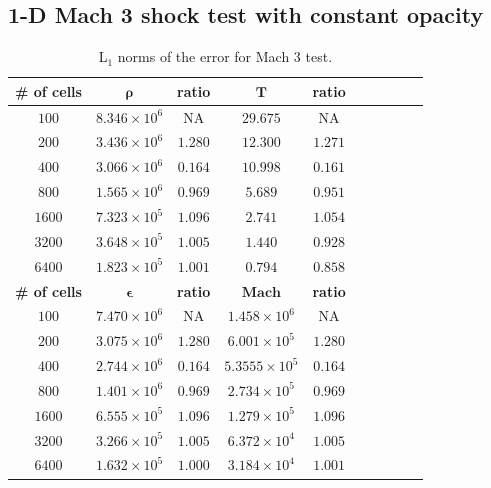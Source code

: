 \documentclass[times,doublespace]{fldauth}%
\begin{document}
\subsection{1-D Mach 3 shock test with constant opacity}
%
\begin{table}[H]
\caption{\label{tbl:table1} L$_1$ norms of the error for Mach 3 test.}
\begin{center}
\begin{tabular}{|c|c|c|c|c|c|c|c|c|c|}
\hline
\textbf{\# of cells} & $\mathbf{\rho}$ & \textbf{ratio} & $\mathbf{T}$ & \textbf{ratio} \\ \hline
$100$ & $8.346\times 10^{6}$ & NA &  $29.675$ & NA \\ \hline
$200$ & $3.436\times 10^{6}$ & $1.280$ &  $12.300$ & $1.271$ \\ \hline
$400$ & $3.066\times10^{6}$ & $0.164$ &  $10.998$ & $0.161$ \\ \hline
$800$ & $1.565\times 10^{6}$ & $0.969$ &  $5.689$ & $0.951$ \\ \hline
$1600$ & $7.323\times 10^{5}$ & $1.096$ &  $2.741$ & $1.054$ \\ \hline
$3200$ & $3.648\times 10^{5}$ & $1.005$ & $1.440$ & $0.928$ \\ \hline
$6400$ & $1.823\times 10^{5}$ & $1.001$ & $0.794$ & $0.858$ \\ \hline
\hline
\textbf{\# of cells} & $\mathbf{\epsilon}$ & \textbf{ratio} &  $\mathbf{Mach}$ & \textbf{ratio} \\ \hline
$100$ & $7.470\times 10^{6}$ & NA & $1.458\times 10^6$ & NA	\\ \hline
$200$ & $3.075\times 10^{6}$ & $1.280$ & $6.001\times 10^5$ & $1.280$	\\ \hline
$400$ & $2.744\times 10^{6}$ & $0.164$ & $5.3555\times 10^5$ & $0.164$	\\ \hline
$800$ & $1.401\times 10^{6}$ & $0.969$ & $2.734\times 10^5$ & $0.969$	\\  \hline
$1600$&$6.555\times 10^{5}$ & $1.096$ & $1.279\times 10^5$ & $1.096$ \\ \hline 
$3200$ & $3.266\times10^{5}$  & $1.005$ & $6.372\times 10^4$ & $1.005$ \\ \hline   
$6400$ & $1.632\times 10^{5}$  & $1.000$ & $3.184\times10^4$ & $1.001$ \\ \hline   
\end{tabular}  
\end{center}
\end{table}
\end{document}
